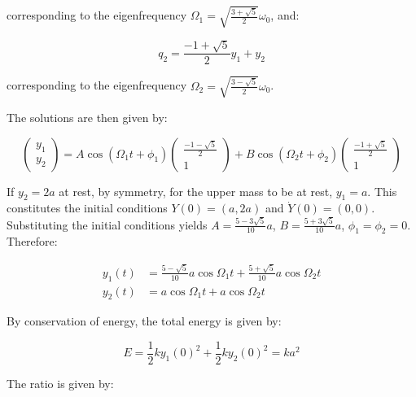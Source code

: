 \documentclass[12pt]{article}
\begin{document}
corresponding to the eigenfrequency $\Omega_{1} = \sqrt{\frac{3 + \sqrt{5}}{2}} \omega_{0}$, and:

\begin{equation}
    q_{2} = \frac{-1+\sqrt{5}}{2} y_{1} + y_{2}
\end{equation}

corresponding to the eigenfrequency $\Omega_{2} = \sqrt{\frac{3 - \sqrt{5}}{2}} \omega_{0}$.

The solutions are then given by:

\begin{equation}
    \begin{pmatrix}
        y_{1} \\
        y_{2}
    \end{pmatrix} =
    A \cos{(\Omega_{1}t + \phi_{1})}
    \begin{pmatrix}
        \frac{-1-\sqrt{5}}{2} \\
        1
    \end{pmatrix}
    +
    B \cos{(\Omega_{2}t + \phi_{2})}
    \begin{pmatrix}
        \frac{-1+\sqrt{5}}{2} \\
        1
    \end{pmatrix}
\end{equation}

If $y_{2} = 2a$ at rest, by symmetry, for the upper mass to be at rest, $y_{1} = a$. This constitutes the initial conditions $Y(0) = (a, 2a)$ and $\dot{Y}(0) = (0, 0)$. Substituting the initial conditions yields $A = \frac{5 - 3\sqrt{5}}{10} a$, $B = \frac{5 + 3\sqrt{5}}{10} a$, $\phi_{1} = \phi_{2} = 0$. Therefore:

\begin{equation}
    \begin{split}
        y_{1}(t) &= \frac{5 - \sqrt{5}}{10} a \cos{\Omega_{1}t} + \frac{5 + \sqrt{5}}{10} a \cos{\Omega_{2}t} \\
        y_{2}(t) &= a \cos{\Omega_{1}t} + a \cos{\Omega_{2}t}
    \end{split}
\end{equation}

By conservation of energy, the total energy is given by:

\begin{equation}
    E = \frac{1}{2} k y_{1}(0)^{2} + \frac{1}{2} k y_{2}(0)^{2} = ka^{2}
\end{equation}

The ratio is given by:
\end{document}

